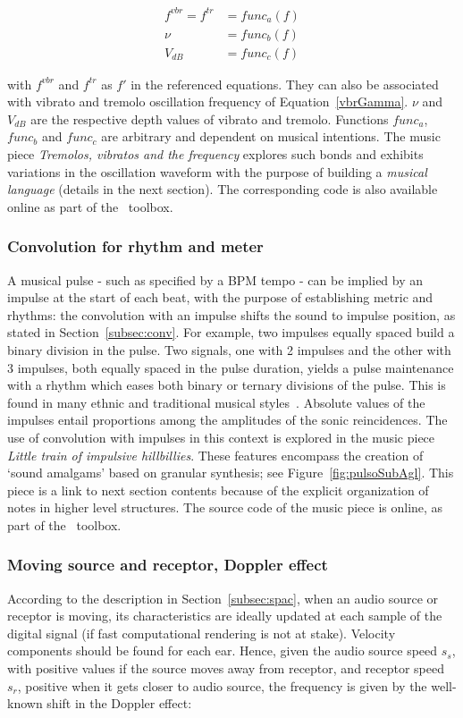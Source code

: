 \begin{equation}\label{eq:vinculos}
\begin{split}
f^{vbr} = f^{tr} & = func_a(f) \\
\nu & = func_b(f) \\
V_{dB} & = func_c(f)
\end{split}
\end{equation}

\noindent with $f^{vbr}$ and $f^{tr}$ as $f'$ in the referenced equations. They can also be associated with vibrato and tremolo oscillation frequency of Equation~\ref{vbrGamma}. 
 $\nu$ and $V_{dB}$ are the respective depth values of vibrato and
tremolo. Functions $func_a$, $func_b$ and $func_c$ are arbitrary and dependent on musical intentions. The music piece \emph{Tremolos, vibratos and the
frequency} explores such bonds and exhibits variations in the oscillation waveform with the purpose of building a \emph{musical
language} (details in the next section). The corresponding code is also available online as part of the \massa\ toolbox.

\subsubsection{Convolution for rhythm and meter}
A musical pulse - such as specified by a BPM
tempo - can be implied by an impulse at the start of each beat, with the purpose of establishing metric and rhythms: the convolution with an impulse shifts the sound to impulse position, as stated in Section~\ref{subsec:conv}. For example, two impulses equally spaced build a binary division in the
pulse. Two signals, one with 2 impulses and the other with 3 impulses, both equally spaced in the pulse duration, yields a pulse
maintenance with a rhythm which eases both binary or ternary
divisions of the pulse. This is found in many ethnic and traditional musical styles~\cite{Gramani}. Absolute values of the impulses entail
proportions among the amplitudes of the sonic reincidences. The use of convolution with impulses in this context is explored in the music piece \emph{Little train of impulsive hillbillies}.
These features encompass
the creation of `sound amalgams' based on granular synthesis; see Figure~\ref{fig:pulsoSubAgl}. This piece is a link to next section contents because of the explicit organization of notes in higher level structures. The source code of the music piece is online, as part of the \massa\ toolbox\cite{MASSA}.


\subsubsection{Moving source and receptor, Doppler effect}
According to the description in Section~\ref{subsec:spac}, when an audio source or receptor is moving, its characteristics are ideally updated at each sample of the digital signal (if fast computational rendering is not at stake). Velocity components should be found for each ear. Hence, given the audio source speed $s_s$, with positive values if the source moves away from receptor, and receptor speed $s_r$, positive when it gets closer to audio source, the frequency is given by the well-known shift in the Doppler effect:

